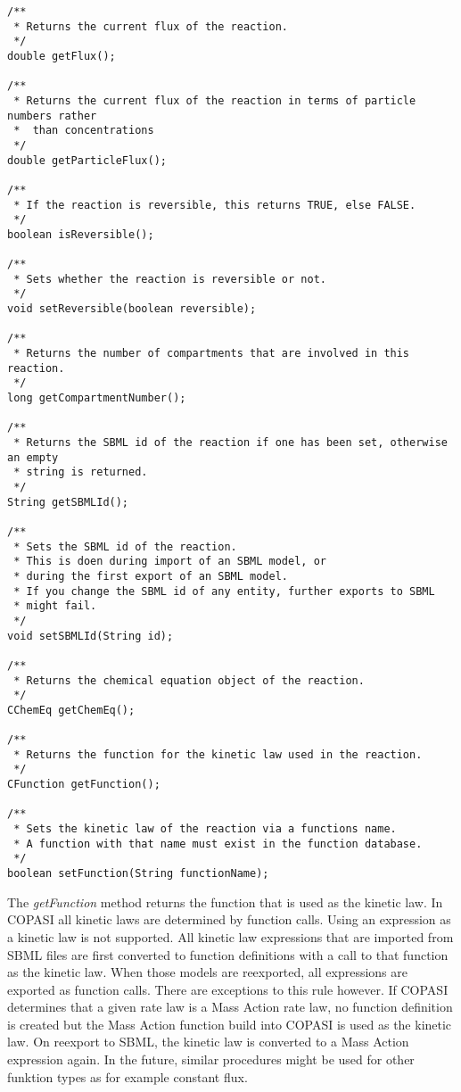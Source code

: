 \documentclass[a4,12pt]{article}
\begin{document}
\begin{lstlisting}
/**
 * Returns the current flux of the reaction.
 */
double getFlux();

/**
 * Returns the current flux of the reaction in terms of particle numbers rather
 *  than concentrations
 */
double getParticleFlux();

/**
 * If the reaction is reversible, this returns TRUE, else FALSE.
 */
boolean isReversible();

/**
 * Sets whether the reaction is reversible or not.
 */
void setReversible(boolean reversible);

/**
 * Returns the number of compartments that are involved in this reaction.
 */
long getCompartmentNumber();

/**
 * Returns the SBML id of the reaction if one has been set, otherwise an empty
 * string is returned.
 */
String getSBMLId();

/**
 * Sets the SBML id of the reaction.
 * This is doen during import of an SBML model, or
 * during the first export of an SBML model.
 * If you change the SBML id of any entity, further exports to SBML
 * might fail.
 */
void setSBMLId(String id);

/**
 * Returns the chemical equation object of the reaction.
 */
CChemEq getChemEq();

/**
 * Returns the function for the kinetic law used in the reaction.
 */
CFunction getFunction();

/**
 * Sets the kinetic law of the reaction via a functions name.
 * A function with that name must exist in the function database.
 */
boolean setFunction(String functionName);
\end{lstlisting}

The \textit{getFunction} method returns the function that is used as the kinetic law. In COPASI all kinetic laws are determined by function calls. Using an expression as a kinetic law is not supported. All kinetic law expressions that are imported from SBML files are first converted to function definitions with a call to that function as the kinetic law. When those models are reexported, all expressions are exported as function calls.
There are exceptions to this rule however. If COPASI determines that a given rate law is a Mass Action rate law, no function definition is created but the Mass Action function build into COPASI is used as the kinetic law. On reexport to SBML, the kinetic law is converted to a Mass Action expression again. In the future, similar procedures might be used for other funktion types as for example constant flux.
\end{document}
